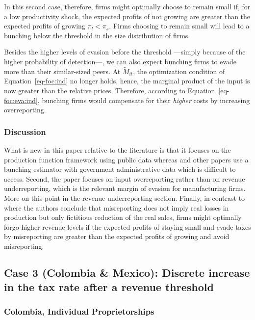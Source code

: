 \documentclass[
  12pt]{article}
\theoremstyle{definition}
\theoremstyle{remark}
\begin{document}
In this second case, therefore, firms might optimally choose to remain
small if, for a low productivity shock, the expected profits of not
growing are greater than the expected profits of growing
\(\pi_l<\pi_s\). Firms choosing to remain small will lead to a bunching
below the threshold in the size distribution of firms.

Besides the higher levels of evasion before the threshold ---simply
because of the higher probability of detection---, we can also expect
bunching firms to evade more than their similar-sized peers. At
\(\tilde{M}_{it}\), the optimization condition of
Equation~\ref{eq-foc:ind} no longer holds, hence, the marginal product
of the input is now greater than the relative prices. Therefore,
according to Equation~\ref{eq-foc:eva:ind}, bunching firms would
compensate for their \emph{higher} costs by increasing overreporting.

\subsubsection{Discussion}\label{discussion}

What is new in this paper relative to the literature is that it focuses
on the production function framework using public data whereas
\citet{Almunia2018} and other papers use a bunching estimator with
government administrative data which is difficult to access. Second, the
paper focuses on input overreporting rather than on revenue
underreporting, which is the relevant margin of evasion for
manufacturing firms. More on this point in the revenue underreporting
section. Finally, in contrast to \citet{Almunia2018} where the authors
conclude that misreporting does not imply real losses in production but
only fictitious reduction of the real sales, firms might optimally forgo
higher revenue levels if the expected profits of staying small and evade
taxes by misreporting are greater than the expected profits of growing
and avoid misreporting.

\subsection{Case 3 (Colombia \& Mexico): Discrete increase in the tax
rate after a revenue
threshold}\label{case-3-colombia-mexico-discrete-increase-in-the-tax-rate-after-a-revenue-threshold}

\subsubsection{Colombia, Individual
Proprietorships}\label{colombia-individual-proprietorships}
\end{document}
